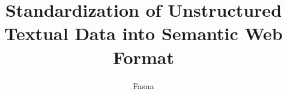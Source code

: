 \documentclass[modernstyle,12pt]{seminar}
\title{Standardization of Unstructured Textual Data into Semantic Web Format}
\author{Fasna }{P.P.}
\begin{document}



%
% 
% 
% 
% 
% 





\nocite{*}		        %



%

\end{document}
